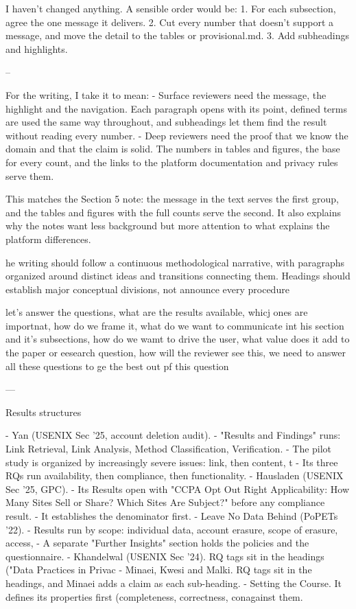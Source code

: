 I haven't changed anything. A sensible order would be:
1. For each subsection, agree the one message it delivers.
2. Cut every number that doesn't support a message, and move the detail to the tables or provisional.md.
3. Add subheadings and highlights.


--



For the writing, I take it to mean:
- Surface reviewers need the message, the highlight and the navigation. Each paragraph opens with its point, defined terms are used the same way throughout, and subheadings let them find the result without reading every number.
- Deep reviewers need the proof that we know the domain and that the claim is solid. The numbers in tables and figures, the base for every count, and the links to the platform documentation and privacy rules serve them.

This matches the Section 5 note: the message in the text serves the first group, and the tables and figures with the full counts serve the second. It also explains why the notes want less background but more attention to what explains the platform differences.




he writing should follow a continuous methodological narrative, with paragraphs organized around distinct ideas and transitions connecting them. Headings should establish major conceptual divisions, not announce every procedure

let's answer the questions, what are the results available, whicj ones are importnat, how do we frame it, what do we want to communicate int his section and it's
  subsections, how do we wamt to drive the user, what value does it add to the paper or eesearch question, how will the reviewer see this, we need to answer all
  these questions to ge the best out pf this question


  ---

Results structures

- Yan (USENIX Sec '25, account deletion audit).
  - "Results and Findings" runs: Link Retrieval, Link Analysis, Method Classification, Verification.
  - The pilot study is organized by increasingly severe issues: link, then content, t
  - Its three RQs run availability, then compliance, then functionality.
- Hausladen (USENIX Sec '25, GPC).
  - Its Results open with "CCPA Opt Out Right Applicability: How Many Sites Sell or Share? Which Sites Are Subject?" before any compliance result.
  - It establishes the denominator first.
- Leave No Data Behind (PoPETs '22).
  - Results run by scope: individual data, account erasure, scope of erasure, access,
  - A separate "Further Insights" section holds the policies and the questionnaire.
- Khandelwal (USENIX Sec '24). RQ tags sit in the headings ("Data Practices in Privac
- Minaei, Kwesi and Malki. RQ tags sit in the headings, and Minaei adds a claim as each sub-heading.
- Setting the Course. It defines its properties first (completeness, correctness, conagainst them.

